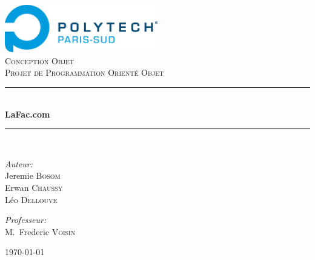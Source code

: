 \newcommand{\HRule}{\rule{\linewidth}{0.5mm}}

\begin{titlepage}
\begin{center}

\includegraphics[width=0.5\textwidth]{polytech}~\\[1cm]

\textsc{\LARGE Conception Objet}\\[1.5cm]

\textsc{\Large Projet de Programmation Orienté Objet}\\[0.5cm]

\HRule \\[0.4cm]
{ \huge \bfseries LaFac.com \\[0.4cm] }
\HRule \\[1.5cm]

\begin{minipage}{0.4\textwidth}
\begin{flushleft} \large
\emph{Auteur:}\\
Jeremie \textsc{Bosom}\\
Erwan \textsc{Chaussy}\\
Léo \textsc{Dellouve}
\end{flushleft}
\end{minipage}
\begin{minipage}{0.4\textwidth}
\begin{flushright} \large
\emph{Professeur:} \\
M.~Frederic \textsc{Voisin}
\end{flushright}
\end{minipage}

\vfill

{\large \today}

\end{center}
\end{titlepage}